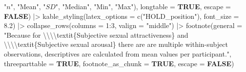 \documentclass[
  bookmarksnumbered]{article}
\newenvironment{Shaded}{\begin{snugshade}}{\end{snugshade}}
\newcommand{\AttributeTok}[1]{\textcolor[rgb]{0.80,0.80,0.80}{#1}}
\newcommand{\ConstantTok}[1]{\textcolor[rgb]{0.86,0.64,0.64}{\textbf{#1}}}
\newcommand{\DecValTok}[1]{\textcolor[rgb]{0.86,0.86,0.80}{#1}}
\newcommand{\FloatTok}[1]{\textcolor[rgb]{0.75,0.75,0.82}{#1}}
\newcommand{\FunctionTok}[1]{\textcolor[rgb]{0.94,0.94,0.56}{#1}}
\newcommand{\NormalTok}[1]{\textcolor[rgb]{0.80,0.80,0.80}{#1}}
\newcommand{\SpecialCharTok}[1]{\textcolor[rgb]{0.86,0.64,0.64}{#1}}
\newcommand{\StringTok}[1]{\textcolor[rgb]{0.80,0.58,0.58}{#1}}
\begin{document}
\begin{Shaded}
\begin{Highlighting}[]
                      \StringTok{"$n$"}\NormalTok{, }\StringTok{"Mean"}\NormalTok{, }\StringTok{"$SD$"}\NormalTok{, }\StringTok{"Median"}\NormalTok{, }\StringTok{"Min"}\NormalTok{, }\StringTok{"Max"}\NormalTok{),}
        \AttributeTok{longtable =} \ConstantTok{TRUE}\NormalTok{,}
        \AttributeTok{escape =} \ConstantTok{FALSE}\NormalTok{) }\SpecialCharTok{|\textgreater{}}
  \FunctionTok{kable\_styling}\NormalTok{(}\AttributeTok{latex\_options =} \FunctionTok{c}\NormalTok{(}\StringTok{"HOLD\_position"}\NormalTok{),}
                \AttributeTok{font\_size =} \FloatTok{8.2}\NormalTok{) }\SpecialCharTok{|\textgreater{}}
  \FunctionTok{collapse\_rows}\NormalTok{(}\AttributeTok{columns =} \DecValTok{1}\SpecialCharTok{:}\DecValTok{3}\NormalTok{, }\AttributeTok{valign =} \StringTok{"middle"}\NormalTok{) }\SpecialCharTok{|\textgreater{}} 
  \FunctionTok{footnote}\NormalTok{(}\AttributeTok{general =} \StringTok{"Because for }\SpecialCharTok{\textbackslash{}\textbackslash{}\textbackslash{}\textbackslash{}}\StringTok{textit\{Subjective sexual attractiveness\} and }
\StringTok{           }\SpecialCharTok{\textbackslash{}\textbackslash{}\textbackslash{}\textbackslash{}}\StringTok{textit\{Subjective sexual arousal\} there are are multiple within{-}subject }
\StringTok{           observations, descriptives are calculated from mean values per participant."}\NormalTok{,}
           \AttributeTok{threeparttable =} \ConstantTok{TRUE}\NormalTok{,}
           \AttributeTok{footnote\_as\_chunk =} \ConstantTok{TRUE}\NormalTok{,}
           \AttributeTok{escape =} \ConstantTok{FALSE}\NormalTok{)}
\end{Highlighting}
\end{Shaded}

\begingroup\fontsize{8.2}{10.2}\selectfont
\end{document}
